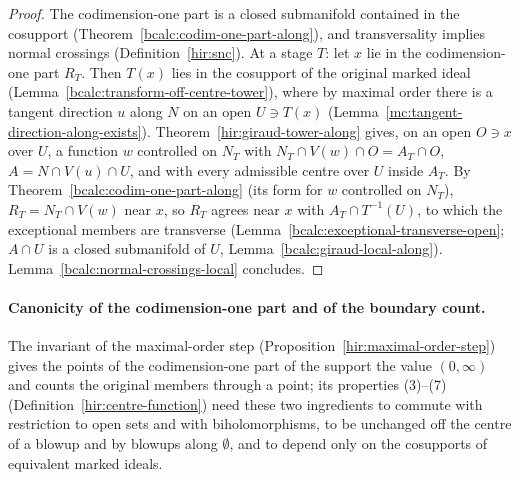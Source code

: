 \begin{proof}
\mixedleanok
The codimension-one part is a closed submanifold contained in the cosupport (Theorem~\ref{bcalc:codim-one-part-along}), and transversality implies normal
crossings (Definition~\ref{hir:snc}). At a stage \(T\): let \(x\) lie in the codimension-one part \(R_T\). Then \(T(x)\) lies in the cosupport of the
original marked ideal (Lemma~\ref{bcalc:transform-off-centre-tower}), where by maximal order there is a tangent direction \(u\) along \(N\) on an open \(U\ni T(x)\)
(Lemma~\ref{mc:tangent-direction-along-exists}). Theorem~\ref{hir:giraud-tower-along} gives, on an open \(O\ni x\) over \(U\), a function \(w\) controlled on
\(N_T\) with \(N_T\cap V(w)\cap O=A_T\cap O\), \(A=N\cap V(u)\cap U\), and with every admissible centre over \(U\) inside \(A_T\). By
Theorem~\ref{bcalc:codim-one-part-along} (its form for \(w\) controlled on \(N_T\)), \(R_T=N_T\cap V(w)\) near \(x\), so \(R_T\) agrees near \(x\) with
\(A_T\cap T^{-1}(U)\), to which the exceptional members are transverse (Lemma~\ref{bcalc:exceptional-transverse-open}; \(A\cap U\) is a closed submanifold of \(U\),
Lemma~\ref{bcalc:giraud-local-along}). Lemma~\ref{bcalc:normal-crossings-local} concludes.
\end{proof}

\paragraph{Canonicity of the codimension-one part and of the boundary count.} The invariant of the maximal-order step
(Proposition~\ref{hir:maximal-order-step}) gives the points of the codimension-one part of the support the value \((0,\infty)\) and counts the original members
through a point; its properties (3)--(7) (Definition~\ref{hir:centre-function}) need these two ingredients to commute with restriction to open sets and with
biholomorphisms, to be unchanged off the centre of a blowup and by blowups along \(\emptyset\), and to depend only on the cosupports of equivalent marked ideals.


